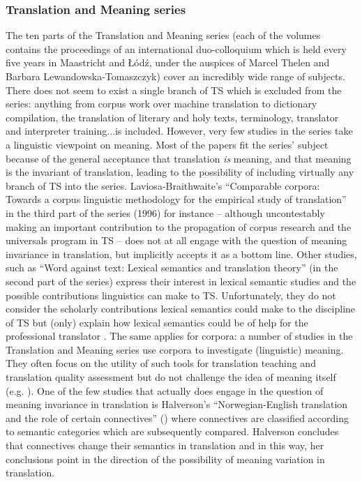\subsubsection{Translation and Meaning series}
\label{sec:2.2.3.1}  
The ten parts of the Translation and Meaning series (each of the volumes contains the proceedings of an international duo-colloquium which is held every five years in Maastricht and Łódź, under the auspices of Marcel Thelen and Barbara Lewandowska-Tomaszczyk) cover an incredibly wide range of subjects. There does not seem to exist a single branch of TS which is excluded from the series: anything from corpus work over machine translation to dictionary compilation, the translation of literary and holy texts, terminology, translator and interpreter training...is included. However, very few studies in the series take a linguistic viewpoint on meaning. Most of the papers fit the series’ subject because of the general acceptance that translation \textit{is} meaning, and that meaning is the invariant of translation, leading to the possibility of including virtually any branch of TS into the series. Laviosa-Braithwaite’s “Comparable corpora: Towards a corpus linguistic methodology for the empirical study of translation” in the third part of the series (1996) for instance – although uncontestably making an important contribution to the propagation of corpus research and the universals program in TS – does not at all engage with the question of meaning invariance in translation, but implicitly accepts it as a bottom line. Other studies, such as   “Word against text: Lexical semantics and translation theory” (in the second part of the series) express their interest in lexical semantic studies and the possible contributions linguistics can make to TS. Unfortunately, they do not consider the scholarly contributions lexical semantics could make to the discipline of TS but (only) explain how lexical semantics could be of help for the professional translator \citep[100]{lewandowska-tomasczyk_specification_2010}. The same applies for corpora: a number of studies in the Translation and Meaning series use corpora to investigate (linguistic) meaning. They often focus on the utility of such tools for translation teaching and translation quality assessment but do not challenge the idea of meaning itself (e.g. \citealt{thelen_equivalence_1997,thelen_corpus-based_2007,thelen_semantic_2008}). One of the few studies that actually does engage in the question of meaning invariance in translation is Halverson’s “Norwegian-English translation and the role of certain connectives” (\citeyear{thelen_norwegian-english_1996}) where connectives are classified according to semantic categories which are subsequently compared. Halverson concludes that connectives change their semantics in translation and in this way, her conclusions point in the direction of the possibility of meaning variation in translation.

